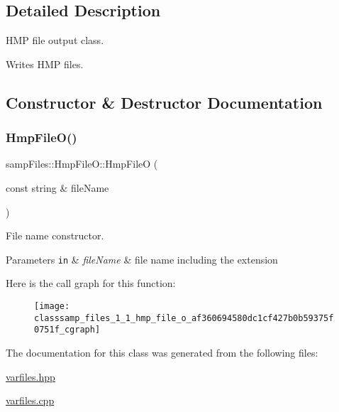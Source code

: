 \subsection{Detailed Description}
H\+MP file output class. 

Writes H\+MP files. 

\subsection{Constructor \& Destructor Documentation}
\mbox{\label{classsamp_files_1_1_hmp_file_o_af360694580dc1cf427b0b59375f0751f}} 
\subsubsection{\texorpdfstring{Hmp\+File\+O()}{HmpFileO()}}
{\footnotesize\ttfamily samp\+Files\+::\+Hmp\+File\+O\+::\+Hmp\+FileO (\begin{DoxyParamCaption}\item[{const string \&}]{file\+Name }\end{DoxyParamCaption})\hspace{0.3cm}{\ttfamily [inline]}}



File name constructor. 


\begin{DoxyParams}[1]{Parameters}
\mbox{\tt in}  & {\em file\+Name} & file name including the extension \\
\hline
\end{DoxyParams}
Here is the call graph for this function\+:\nopagebreak
\begin{figure}[H]
\begin{center}
\leavevmode
\texttt{[image: classsamp\_files\_1\_1\_hmp\_file\_o\_af360694580dc1cf427b0b59375f0751f\_cgraph]}
\end{center}
\end{figure}


The documentation for this class was generated from the following files\+:\begin{DoxyCompactItemize}
\item 
\hyperlink{varfiles_8hpp}{varfiles.\+hpp}\item 
\hyperlink{varfiles_8cpp}{varfiles.\+cpp}\end{DoxyCompactItemize}
